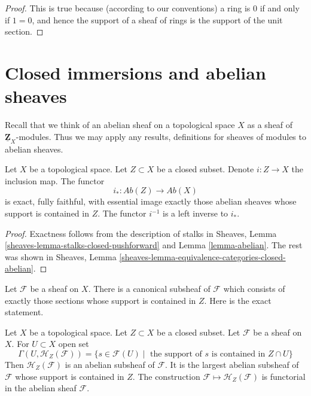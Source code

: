 \begin{proof}
This is true because (according to our conventions)
a ring is $0$ if and only if
$1 = 0$, and hence the support of a sheaf of rings
is the support of the unit section.
\end{proof}






\section{Closed immersions and abelian sheaves}
\label{section-closed-immersions}

\noindent
Recall that we think of an abelian sheaf on a topological space $X$ as a
sheaf of $\underline{\mathbf{Z}}_X$-modules. Thus we may apply any results,
definitions for sheaves of modules to abelian sheaves.

\begin{lemma}
\label{lemma-i-star-exact}
Let $X$ be a topological space. Let $Z \subset X$ be a closed subset.
Denote $i : Z \to X$ the inclusion map. The functor
$$
i_* : \textit{Ab}(Z) \longrightarrow \textit{Ab}(X)
$$
is exact, fully faithful, with essential image exactly those
abelian sheaves whose support is contained in $Z$. The functor $i^{-1}$
is a left inverse to $i_*$.
\end{lemma}

\begin{proof}
Exactness follows from the description of
stalks in Sheaves, Lemma \ref{sheaves-lemma-stalks-closed-pushforward}
and Lemma \ref{lemma-abelian}. The rest was shown in
Sheaves, Lemma \ref{sheaves-lemma-equivalence-categories-closed-abelian}.
\end{proof}

\noindent
Let $\mathcal{F}$ be a sheaf on $X$. There is a canonical subsheaf
of $\mathcal{F}$ which consists of exactly those sections whose
support is contained in $Z$. Here is the exact statement.

\begin{lemma}
\label{lemma-sections-support-in-closed}
Let $X$ be a topological space. Let $Z \subset X$ be a closed subset.
Let $\mathcal{F}$ be a sheaf on $X$. For $U \subset X$ open set
$$
\Gamma(U, \mathcal{H}_Z(\mathcal{F})) =
\{s \in \mathcal{F}(U) \mid
\text{ the support of }s\text{ is contained in }Z \cap U\}
$$
Then $\mathcal{H}_Z(\mathcal{F})$ is an abelian subsheaf of
$\mathcal{F}$. It is the largest abelian subsheaf of
$\mathcal{F}$ whose support is contained in $Z$. The construction
$\mathcal{F} \mapsto \mathcal{H}_Z(\mathcal{F})$ is functorial
in the abelian sheaf $\mathcal{F}$.
\end{lemma}

